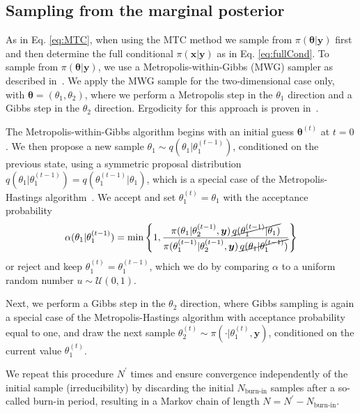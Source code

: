 \subsection{Sampling from the marginal posterior}
As in Eq. \ref{eq:MTC}, when using the MTC method we sample from $\pi(\bm{\theta} |  \bm{y})$ first and then determine the full conditional $\pi(\bm{x} |  \bm{y})$ as in Eq. \ref{eq:fullCond}. To sample from $\pi(\bm{\theta} |  \bm{y})$, we use a Metropolis-within-Gibbs (MWG) sampler as described in~\cite{fox2016fast}.
We apply the MWG sample for the two-dimensional case only, with $\bm{\theta} = (\theta_1, \theta_2)$, where we perform a Metropolis step in the $\theta_1$ direction and a Gibbs step in the $\theta_2$ direction.
Ergodicity for this approach is proven in~\cite{roberts2006harris}.


The Metropolis-within-Gibbs algorithm begins with an initial guess $\bm{\theta}^{(t)}$ at $t=0$. We then propose a new sample $\theta_1 \sim q(\theta_1 |  \theta_1^{(t-1)})$, conditioned on the previous state, using a symmetric proposal distribution $q(\theta_1 |  \theta_1^{(t-1)}) = q(\theta_1^{(t-1)} |  \theta_1)$, which is a special case of the Metropolis-Hastings algorithm~\cite{roberts2006harris}.
We accept and set $\theta_1^{(t)} = \theta_1$ with the acceptance probability
\begin{align}
	\alpha(\theta_1 |  \theta_1^{(t-1)}) = \min \left\{ 1, \frac{\pi(\theta_1 |  \theta_2^{(t-1)}, \bm{y}) \, \cancel{q(\theta_1^{(t-1)} |  \theta_1)}}{\pi(\theta_1^{(t-1)} |  \theta_2^{(t-1)}, \bm{y}) \, \cancel{q(\theta_1 |  \theta_1^{(t-1)})}} \right\}
\end{align}
or reject and keep $\theta_1^{(t)} = \theta_1^{(t-1)}$, which we do by comparing $\alpha$ to a uniform random number $u \sim \mathcal{U}(0,1)$. 

Next, we perform a Gibbs step in the $\theta_2$ direction, where Gibbs sampling is again a special case of the Metropolis-Hastings algorithm with acceptance probability equal to one, and draw the next sample $\theta_2^{(t)} \sim \pi(\cdot |  \theta_1^{(t)}, \bm{y})$, conditioned on the current value $\theta_1^{(t)}$. 

We repeat this procedure $N^{\prime}$ times and ensure convergence independently of the initial sample (irreducibility) by discarding the initial $N_{\text{burn-in}}$ samples after a so-called burn-in period, resulting in a Markov chain of length $N = N^{\prime} - N_{\text{burn-in}}$.

